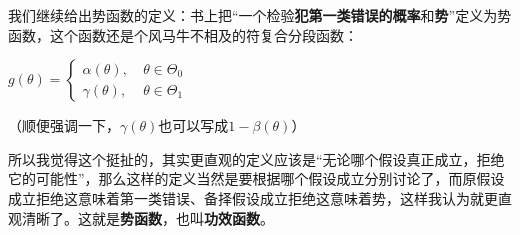\documentclass[10pt, a4paper]{article}
\begin{document}
我们继续给出势函数的定义：书上把“一个检验\textbf{犯第一类错误的概率}和\textbf{势}”定义为势函数，这个函数还是个风马牛不相及的符复合分段函数：

\begin{center}
    $
    g(\theta)=\left\{
    \begin{aligned}
    \alpha(\theta),~ & \theta \in \Theta_{0} \\
    \gamma(\theta),~ & \theta \in \Theta_{1}
    \end{aligned}\right.$
\end{center} \par
（顺便强调一下，$\gamma(\theta)$也可以写成$1-\beta(\theta)$）\par
所以我觉得这个挺扯的，其实更直观的定义应该是“无论哪个假设真正成立，拒绝它的可能性”，那么这样的定义当然是要根据哪个假设成立分别讨论了，而原假设成立拒绝这意味着第一类错误、备择假设成立拒绝这意味着势，这样我认为就更直观清晰了。这就是\textbf{势函数}，也叫\textbf{功效函数}。\\ \par
\end{document}
